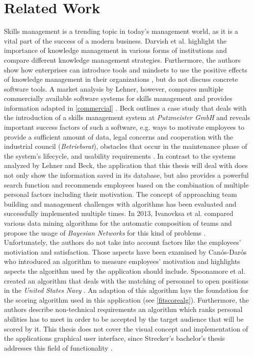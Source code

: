 \chapter{Related Work}

Skills management is a trending topic in today's management world, as it is a vital part of the success of a modern business.
Darvish et al. highlight the importance of knowledge management in various forms of institutions and compare different knowledge management strategies.
Furthermore, the authors show how enterprises can introduce tools and mindsets to use the positive effects of knowledge management in their organizations \cite{darvish}, but do not discuss concrete software tools.
A market analysis by Lehner, however, compares multiple commercially available software systems for skills management and provides information adapted in \ref{commercial}  \cite{Marktanalyse}.
\newline
Beck outlines a case study that deals with the introduction of a skills management system at \textit{Putzmeister GmbH} and reveals important success factors of such a software, e.g. ways to motivate employees to provide a sufficient amount of data, legal concerns and cooperation with the industrial council (\textit{Betriebsrat}), obstacles that occur in the maintenance phase of the system's lifecycle, and usability requirements \cite{beck}.
\newline
In contrast to the systems analyzed by Lehner and Beck, the application that this thesis will deal with does not only
show the information saved in its database, but also provides a powerful search function and recommends employees based on the combination of multiple personal factors including their motivation.
\newline
The concept of approaching team building and management challenges with algorithms has been evaluated and successfully implemented multiple times.
In 2013, Ivanovksa et al. compared various data mining algorithms for the automatic composition of teams and propose the usage of \textit{Bayesian Networks} for this kind of problems \cite{ivanovska}. Unfortunately, the authors do not take into account factors like the employees' motiviation and satisfaction. Those aspects have been examined by Canós-Darós who introduced an algorithm to measure employees' motivation \cite{CanosDaros2013} and highlights aspects the algorithm used by the application should include.
Spoonamore et al. created an algorithm that deals with the matching of personnel to open positions in the \textit{United States Navy} \cite{USN}. An adaption of this algorithm lays the foundation for the scoring algorithm used in this application (see \ref{fitscorealg}). Furthermore, the authors describe non-technical requirements an algorithm which ranks personal abilities has to
meet in order to be accepted by the target audience that will be scored by it.
\newline
This thesis does not cover the visual concept and implementation of the applications graphical user interface, since
Strecker's bachelor's thesis addresses this field of functionality \cite{strecker}.
